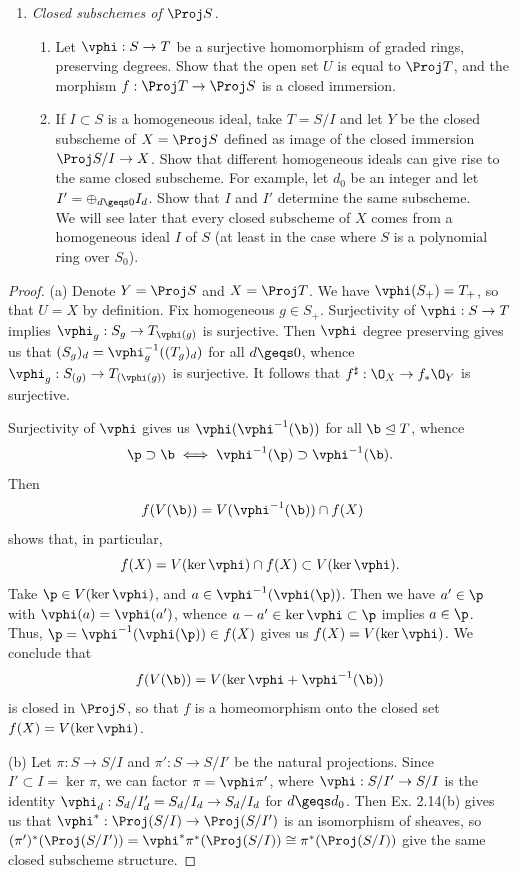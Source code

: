 \documentclass[12pt]{amsart}
\begin{document}
\begin{enumerate}
 	\item[3.12.] {
      \emph{Closed subschemes of $\Proj S$.}
      \begin{enumerate}
        \item Let $\vphi:S\to T$ be a surjective homomorphism of graded rings, preserving degrees.
          Show that the open set $U$ is equal to $\Proj T$, and the morphism $f:\Proj T\to \Proj S$ is a closed immersion.
        \item If $I\subset S$ is a homogeneous ideal, take $T=S/I$ and let $Y$ be the closed subscheme of $X=\Proj S$ defined as image of the closed immersion $\Proj S/I\to X$.
          Show that different homogeneous ideals can give rise to the same closed subscheme.
          For example, let $d_0$ be an integer and let $I'=\oplus_{d\geqs 0}I_d$.
          Show that $I$ and $I'$ determine the same subscheme.\\
          We will see later that every closed subscheme of $X$ comes from a homogeneous ideal $I$ of $S$ (at least in the case where $S$ is a polynomial ring over $S_0$).
      \end{enumerate}
    }
\end{enumerate}
 
\begin{proof}
  (a) Denote $Y=\Proj S$ and $X=\Proj T$.
  We have $\vphi(S_+)= T_+$, so that $U=X$ by definition.
  Fix homogeneous $g\in S_+$.
  Surjectivity of $\vphi:S\to T$ implies $\vphi_{g}:S_{g}\to T_{\vphi(g)}$ is surjective.
  Then $\vphi$ degree preserving gives us that $(S_g)_d=\vphi_g^{-1}((T_g)_d)$ for all $d\geqs 0$, whence $\vphi_g:S_{(g)}\to T_{(\vphi(g))}$ is surjective.
  It follows that $f^\sharp:\O_X\to f_*\O_Y$ is surjective.

  Surjectivity of $\vphi$ gives us $\vphi(\vphi^{-1}(\b))$ for all $\b\trianglelefteq T$,  whence
  \[
    \p\supset \b \iff \vphi^{-1}(\p)\supset \vphi^{-1}(\b).
  \] 
  Then
  \begin{align*}
    f(V(\b)) &= V(\vphi^{-1}(\b))\cap f(X)
  \end{align*}
  shows that, in particular,
  \[
    f(X) = V(\ker\vphi)\cap f(X)\subset V(\ker\vphi).
  \] 
  Take $\p\in V(\ker\vphi)$, and $a\in \vphi^{-1}(\vphi(\p))$.
  Then we have $a'\in \p$ with $\vphi(a)=\vphi(a')$, whence $a-a'\in \ker\vphi\subset \p$ implies $a\in \p$.
  Thus, $\p=\vphi^{-1}(\vphi(\p))\in f(X)$ gives us $f(X)=V(\ker\vphi)$.
  We conclude that 
  \[
    f(V(\b)) = V(\ker\vphi + \vphi^{-1}(\b))
  \] 
  is closed in $\Proj S$, so that $f$ is a homeomorphism onto the closed set $f(X)=V(\ker\vphi)$.

  (b) Let $\pi: S\to S/I$ and $\pi':S\to S/I'$ be the natural projections.
  Since $I'\subset I=\ker\pi$, we can factor $\pi=\vphi\pi'$, where $\vphi:S/I'\to S/I$ is the identity $\vphi_d:S_d/I'_d=S_d/I_d\to S_d/I_d$ for $d\geqs d_0$.
  Then Ex. 2.14(b) gives us that $\vphi^*:\Proj (S/I)\to \Proj (S/I')$ is an isomorphism of sheaves, so $(\pi')^*(\Proj (S/I'))=\vphi^*\pi^*(\Proj (S/I))\cong \pi^*(\Proj(S/I))$ give the same closed subscheme structure.
\end{proof}
\end{document}
